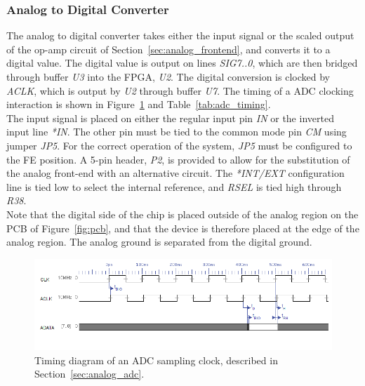 \documentclass[titlepage]{scrartcl}
\begin{document}
	\clearpage

	\subsubsection{Analog to Digital Converter \label{sec:analog_adc}}
	The analog to digital converter takes either the input signal or the scaled output of the op-amp circuit of Section~\ref{sec:analog_frontend}, and converts it to a digital value. The digital value is output on lines \textit{SIG7..0}, which are then bridged through buffer \textit{U3} into the FPGA, \textit{U2}. The digital conversion is clocked by \textit{ACLK}, which is output by \textit{U2} through buffer \textit{U7}. The timing of a ADC clocking interaction is shown in Figure~\ref{fig:adc_timing} and Table~\ref{tab:adc_timing}.\\

	The input signal is placed on either the regular input pin \textit{IN} or the inverted input line \textit{*IN}. The other pin must be tied to the common mode pin \textit{CM} using jumper \textit{JP5}. For the correct operation of the system, \textit{JP5} must be configured to the FE position. A 5-pin header, \textit{P2}, is provided to allow for the substitution of the analog front-end with an alternative circuit. The \textit{*INT/EXT} configuration line is tied low to select the internal reference, and \textit{RSEL} is tied high through \textit{R38}.\\

	Note that the digital side of the chip is placed outside of the analog region on the PCB of Figure~\ref{fig:pcb}, and that the device is therefore placed at the edge of the analog region. The analog ground is separated from the digital ground.\\

	\begin{figure}[h!]
	\vspace{-2cm}
	\centerline{\includegraphics[width=25cm, angle=90, origin=c]{img/adc.png}}
		\vspace{1cm}
                	\caption{Timing diagram of an ADC sampling clock, described in Section~\ref{sec:analog_adc}.}
               	\label{fig:adc_timing}
	\end{figure}
\end{document}
